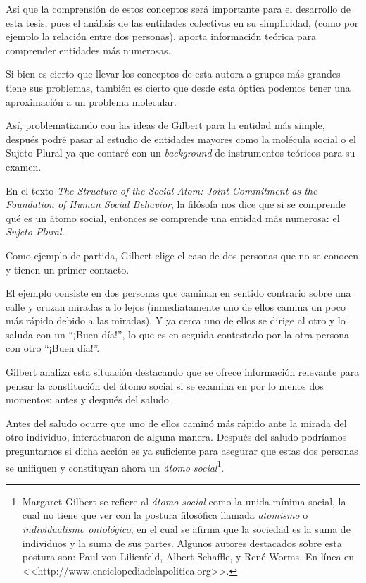 \documentclass[oneside]{book}
\begin{document}
Así que la comprensión de estos conceptos será importante para el desarrollo de esta tesis, pues el análisis de las entidades colectivas en su simplicidad, (como por ejemplo la relación entre dos personas), aporta información teórica para comprender entidades más numerosas. 

Si bien es cierto que llevar los conceptos de esta autora a grupos más grandes tiene sus problemas, también es cierto que desde esta óptica podemos tener una aproximación a un problema molecular.

Así, problematizando con las ideas de Gilbert para la entidad más simple, después podré pasar al estudio de entidades mayores como la molécula social o el Sujeto Plural ya que contaré con un \textit{background} de instrumentos teóricos para su examen.

En el texto \textit{The Structure of the Social Atom: Joint Commitment as the Foundation of Human Social Behavior}\cite{gilbert_1}, la filósofa nos dice que si se comprende qué es un átomo social, entonces se comprende una entidad más numerosa: el \textit{Sujeto Plural.}

Como ejemplo de partida, Gilbert elige el caso de dos personas que no se conocen y tienen un primer contacto.

El ejemplo consiste en dos personas que caminan en sentido contrario sobre una calle y cruzan miradas a lo lejos (inmediatamente uno de ellos camina un poco más rápido debido a las miradas). Y ya cerca uno de ellos se dirige al otro y lo saluda con un “¡Buen día!”, lo que es en seguida contestado por la otra persona con otro “¡Buen día!”.

Gilbert analiza esta situación destacando que se ofrece información relevante para pensar la constitución del átomo social si se examina en por lo menos dos momentos: antes y después del saludo.

Antes del saludo ocurre que uno de ellos caminó más rápido ante la mirada del otro individuo, interactuaron de alguna manera. Después del saludo podríamos preguntarnos si dicha acción es ya suficiente para asegurar que estas dos personas se unifiquen y constituyan ahora un \textit{átomo social}\footnote{Margaret Gilbert se refiere al \textit{átomo social} como la unida mínima social, la cual no tiene que ver con la postura filosófica llamada \textit{atomismo} o \textit{individualismo ontológico}, en el cual se afirma que la sociedad es la suma de individuos y la suma de sus partes. Algunos autores destacados sobre esta postura son: Paul von Lilienfeld, Albert Schaffle, y René Worms. En línea en <<http://www.enciclopediadelapolitica.org>>.}.
\end{document}
